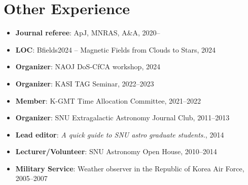 \documentclass[11pt,letterpaper,roman]{moderncv}        %
\begin{document}


\section{Other Experience}
\begin{itemize}
\setlength\itemsep{0.0em}
\item {\bfseries Journal referee}: ApJ, MNRAS, A\&A, 2020--
\item {\bfseries LOC}: Bfields2024 -- Magnetic Fields from Clouds to Stars, 2024
\item {\bfseries Organizer}: NAOJ DoS-CfCA workshop, 2024
\item {\bfseries Organizer}: KASI TAG Seminar, 2022--2023
\item {\bfseries Member}: K-GMT Time Allocation Committee, 2021--2022
\item {\bfseries Organizer}: SNU Extragalactic Astronomy Journal Club, 2011--2013
\item {\bfseries Lead editor}: \textit{A quick guide to SNU astro graduate students.}, 2014
\item {\bfseries Lecturer/Volunteer}: SNU Astronomy Open House, 2010--2014
\item {\bfseries Military Service}: Weather observer in the Republic of Korea Air Force, 2005--2007
\end{itemize}
\end{document}
